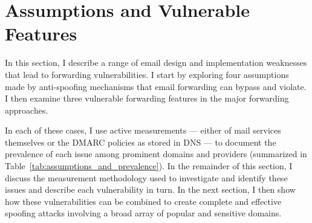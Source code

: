 \section{Assumptions and Vulnerable Features}
\label{sec:assumptions}

In this section, I describe a range of email design and
implementation weaknesses that lead to forwarding vulnerabilities.
I start by exploring four assumptions made by anti-spoofing mechanisms
that email forwarding can bypass and violate.  I then examine
three vulnerable forwarding features in the major forwarding
approaches.

In each of these cases, I use active
measurements --- either of mail services themselves or the DMARC policies
as stored in DNS --- to document the prevalence of each issue
among prominent domains and
providers (summarized in Table~\ref{tab:assumptions_and_prevalence}).
In the remainder of this section, I discuss the measurement
methodology used to investigate and identify these issues and
describe each vulnerability in turn.  In the next section,
I then show how these vulnerabilities can
be combined to create complete and effective spoofing attacks
involving a broad array of popular and sensitive domains.





